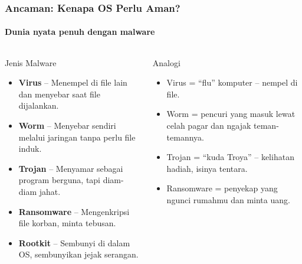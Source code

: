 \documentclass[t,aspectratio=169,xcolor=dvipsnames]{beamer}
\begin{document}
\begin{frame}
    \frametitle{Ancaman: Kenapa OS Perlu Aman?}
    \framesubtitle{Dunia nyata penuh dengan malware}

    \begin{columns}[T]
        \begin{alertblock}{Jenis Malware}
            \footnotesize
            \begin{itemize}
                \item \textbf{Virus} -- Menempel di file lain dan menyebar saat file dijalankan.
                \item \textbf{Worm} -- Menyebar sendiri melalui jaringan tanpa perlu file induk.
                \item \textbf{Trojan} -- Menyamar sebagai program berguna, tapi diam-diam jahat.
                \item \textbf{Ransomware} -- Mengenkripsi file korban, minta tebusan.
                \item \textbf{Rootkit} -- Sembunyi di dalam OS, sembunyikan jejak serangan.
            \end{itemize}
        \end{alertblock}

        \begin{exampleblock}{Analogi}
            \footnotesize
            \begin{itemize}
                \item Virus = ``flu'' komputer -- nempel di file.
                \item Worm = pencuri yang masuk lewat celah pagar dan ngajak teman-temannya.
                \item Trojan = ``kuda Troya'' -- kelihatan hadiah, isinya tentara.
                \item Ransomware = penyekap yang ngunci rumahmu dan minta uang.
            \end{itemize}
        \end{exampleblock}
    \end{columns}
\end{frame}
\end{document}
